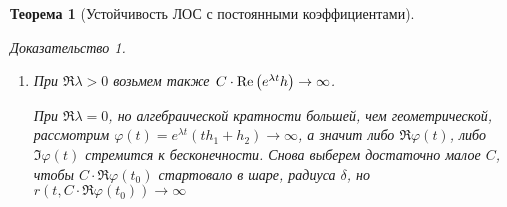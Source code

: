 \documentclass[a5paper, 10pt]{article}
\theoremstyle{definition}
\theoremstyle{plain}
\newtheorem{Th}{Теорема}
\theoremstyle{remark}
\newtheorem*{Proof}{Доказательство}
\begin{document}
\begin{Th}[Устойчивость ЛОС с постоянными коэффициентами]
\begin{Proof}
\begin{enumerate}
				Покажем, почему устойчивость не асимптотическая.
				
				Мы знаем, что решение системы имеет вид $\varphi(t) = e^{\lambda t} h$, где $h$ -- собственный вектор. 
				\[
				\hm{\varphi(t)} = \hm{e^{\lambda t}} \hm{h} = \hm{h} \not \to 0.
				\]
				
				Таким образом, либо $\Im \varphi(t)$, либо $\Re \varphi(t)$ не стремится к нулю.
				
				Пусть $\Re \varphi(t) \not \to 0$. Тогда возьмем такое $C$, чтобы $C\cdot \Re \varphi(t_0)$ лежало в шаре, радиуса $\varepsilon$. И тогда $r(t, C\cdot \Re \varphi(t_0)) \not \to 0$, что и требовалось.
				\item При $\Re \lambda>0$ возьмем также $C\cdot \mathop{\mathrm{Re}} \left(e^{\lambda t}h\right) \rightarrow \infty$.
				
				При $\Re \lambda = 0$, но алгебраической кратности большей, чем геометрической, рассмотрим $\varphi(t) = e^{\lambda t} (th_1+h_2) \to \infty$, а значит либо $\Re \varphi(t)$, либо $\Im \varphi(t)$ стремится к бесконечности. Снова выберем достаточно малое $C$, чтобы $C\cdot \Re \varphi(t_0)$ стартовало в шаре, радиуса $\delta$, но $r(t, C\cdot \Re \varphi(t_0)) \to \infty$
			\end{enumerate}
		\end{Proof}
	\end{Th}
	
	
\end{document}

